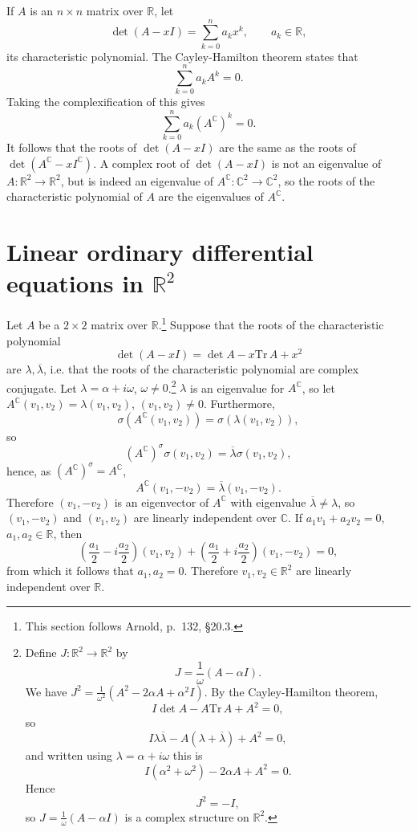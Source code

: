 \documentclass{article}
\newcommand{\Tr}{\textrm{Tr}\,}
\begin{document}
If $A$ is an $n \times n$ matrix over $\mathbb{R}$, let 
\[
\det(A-xI)=\sum_{k=0}^n a_k x^k, \qquad a_k \in \mathbb{R},
\]
its characteristic polynomial. The Cayley-Hamilton theorem states that
\[
\sum_{k=0}^n a_k A^k=0.
\]
Taking the complexification of this gives
\[
\sum_{k=0}^n a_k (A^\mathbb{C})^k=0.
\]
It follows that the roots of $\det(A-xI)$ are the same as the roots of $\det(A^\mathbb{C}-xI^\mathbb{C})$. A complex root 
of $\det(A-xI)$ is not an eigenvalue of $A:\mathbb{R}^2 \to \mathbb{R}^2$, but is indeed an eigenvalue of $A^\mathbb{C}:\mathbb{C}^2
\to \mathbb{C}^2$, so the roots of the characteristic polynomial
of $A$ are the eigenvalues of $A^\mathbb{C}$.

\section{Linear ordinary differential equations in $\mathbb{R}^2$}
Let $A$ be a $2 \times 2$ matrix over $\mathbb{R}$.\footnote{This section follows Arnold, p.~132, \S 20.3.} Suppose that the roots of
the characteristic polynomial
\[
\det(A-x I)=\det A-x \Tr A + x^2
\]
are $\lambda,\overline{\lambda}$, i.e. that the roots of the characteristic polynomial are
complex conjugate. Let $\lambda=\alpha+i\omega$, $\omega \neq 0$.\footnote{Define $J: \mathbb{R}^2 \to \mathbb{R}^2$ by
\[
J=\frac{1}{\omega}(A-\alpha I ).
\]
We have $J^2=\frac{1}{\omega^2}(A^2-2\alpha A+\alpha^2 I)$. By the Cayley-Hamilton theorem, 
\[
I\det A - A\Tr A + A^2=0,
\]
so
\[
I \lambda \overline{\lambda}-A(\lambda+\overline{\lambda})+A^2=0,
\]
and written using $\lambda=\alpha+i\omega$ this is
\[
I(\alpha^2+\omega^2)-2\alpha A+A^2=0.
\]
Hence
\[
J^2=-I,
\]
so $J=\frac{1}{\omega}(A-\alpha I )$ is a complex structure on $\mathbb{R}^2$.}
$\lambda$ is an eigenvalue for $A^\mathbb{C}$, so
let $A^\mathbb{C}(v_1,v_2)=\lambda(v_1,v_2)$, $(v_1,v_2) \neq 0$. 
Furthermore,
\[
\sigma(A^\mathbb{C}(v_1,v_2))=\sigma(\lambda(v_1,v_2)),
\]
so
\[
(A^\mathbb{C})^\sigma \sigma(v_1,v_2)=\overline{\lambda} \sigma(v_1,v_2),
\]
hence, as $(A^\mathbb{C})^\sigma=A^\mathbb{C}$,
\[
A^\mathbb{C}(v_1,-v_2)=\overline{\lambda} (v_1,-v_2).
\]
Therefore $(v_1,-v_2)$ is an eigenvector of $A^\mathbb{C}$ with eigenvalue $\overline{\lambda} \neq \lambda$, so
$(v_1,-v_2)$ and $(v_1,v_2)$ are linearly independent over $\mathbb{C}$. If $a_1v_1+a_2v_2=0$, $a_1,a_2 \in \mathbb{R}$, then
\[
\left(\frac{a_1}{2}-i\frac{a_2}{2}\right)(v_1,v_2)+\left(\frac{a_1}{2}+i\frac{a_2}{2}\right)(v_1,-v_2)=0,
\]
from which it follows that $a_1,a_2=0$. Therefore $v_1,v_2 \in \mathbb{R}^2$ are linearly independent over $\mathbb{R}$. 
\end{document}
